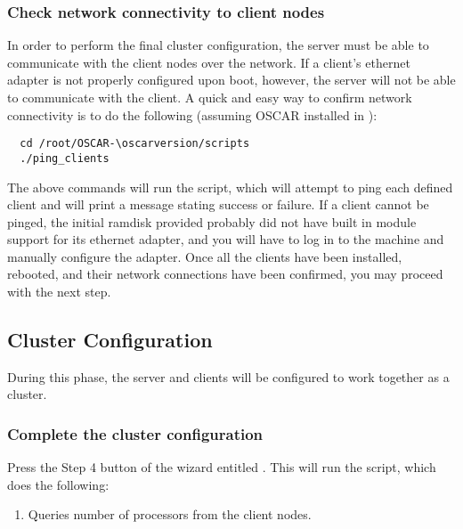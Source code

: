 \subsubsection{Check network connectivity to client nodes}

In order to perform the final cluster configuration, the server must
be able to communicate with the client nodes over the network. If a
client's ethernet adapter is not properly configured upon boot,
however, the server will not be able to communicate with the client. A
quick and easy way to confirm network connectivity is to do the
\begchange
following (assuming OSCAR installed in ):

\begin{verbatim}
  cd /root/OSCAR-\oscarversion/scripts
  ./ping_clients
\end{verbatim}
\endchange

The above commands will run the  script, which will
attempt to ping each defined client and will print a message stating
success or failure. If a client cannot be pinged, the initial ramdisk
provided probably did not have built in module support for its
ethernet adapter, and you will have to log in to the machine and
manually configure the adapter. Once all the clients have been
installed, rebooted, and their network connections have been
confirmed, you may proceed with the next step.


\subsection{Cluster Configuration}

During this phase, the server and clients will be configured to work
together as a cluster.

\subsubsection{Complete the cluster configuration}

Press the Step 4 button of the wizard entitled .  This will run the  script,
which does the following:

\begin{enumerate}
\item Queries number of processors from the client nodes.
  
\end{enumerate}

